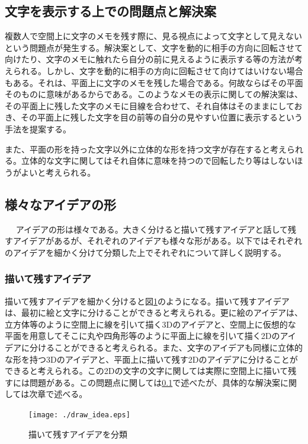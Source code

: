 \documentclass[11pt,a4j, titlepage]{jarticle} %
\begin{document}
\subsection{文字を表示する上での問題点と解決案} \label{moji_mondai}
複数人で空間上に文字のメモを残す際に、見る視点によって文字として見えないという問題点が発生する。解決案として、文字を動的に相手の方向に回転させて向けたり、文字のメモに触れたら自分の前に見えるように表示する等の方法が考えられる。しかし、文字を動的に相手の方向に回転させて向けてはいけない場合もある。それは、平面上に文字のメモを残した場合である。何故ならばその平面そのものに意味があるからである。このようなメモの表示に関しての解決案は、その平面上に残した文字のメモに目線を合わせて、それ自体はそのままにしておき、その平面上に残した文字を目の前等の自分の見やすい位置に表示するという手法を提案する。

また、平面の形を持った文字以外に立体的な形を持つ文字が存在すると考えられる。立体的な文字に関してはそれ自体に意味を持つので回転したり等はしないほうがよいと考えられる。

\subsection{様々なアイデアの形}　\label{idea_katachi}
アイデアの形は様々である。大きく分けると描いて残すアイデアと話して残すアイデアがあるが、それぞれのアイデアも様々な形がある。以下ではそれぞれのアイデアを細かく分けて分類した上でそれぞれについて詳しく説明する。

\subsubsection{描いて残すアイデア} \label{draw_idea}
描いて残すアイデアを細かく分けると図\ref{fig:draw_idea}のようになる。描いて残すアイデアは、最初に絵と文字に分けることができると考えられる。更に絵のアイデアは、立方体等のように空間上に線を引いて描く3Dのアイデアと、空間上に仮想的な平面を用意してそこに丸や四角形等のように平面上に線を引いて描く2Dのアイデアに分けることができると考えられる。また、文字のアイデアも同様に立体的な形を持つ3Dのアイデアと、平面上に描いて残す2Dのアイデアに分けることができると考えられる。この2Dの文字の文字に関しては実際に空間上に描いて残すには問題がある。この問題点に関しては\ref{moji_mondai}で述べたが、具体的な解決案に関しては次章で述べる。

\begin{figure}[H]
  \begin{center}
    \texttt{[image: ./draw\_idea.eps]}
    \caption{描いて残すアイデアを分類}
    \label{fig:draw_idea}
  \end{center}
\end{figure}
\end{document}
